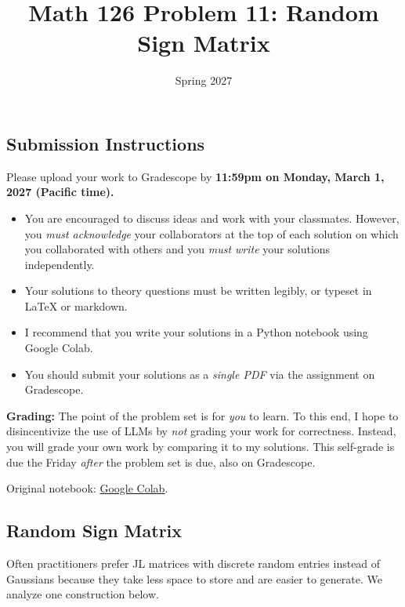 \documentclass{article}
\title{Math 126 Problem 11: Random Sign Matrix}
\author{} %
\date{Spring 2027}
\begin{document}
\maketitle

\hypertarget{submission-instructions}{%
\subsection*{Submission Instructions}\label{submission-instructions}}

Please upload your work to Gradescope by \textbf{11:59pm on Monday, March 1, 2027 (Pacific time).}

\begin{itemize}
\item
  You are encouraged to discuss ideas and work with your classmates. However, you \emph{must acknowledge} your collaborators at the top of each solution on which you collaborated with others and you \emph{must write} your solutions independently.
\item
  Your solutions to theory questions must be written legibly, or typeset in LaTeX or markdown.
\item
  I recommend that you write your solutions in a Python notebook using Google Colab.
\item
  You should submit your solutions as a \emph{single PDF} via the assignment on Gradescope.
\end{itemize}

\textbf{Grading:} The point of the problem set is for \emph{you} to learn. To this end, I hope to disincentivize the use of LLMs by \emph{not} grading your work for correctness. Instead, you will grade your own work by comparing it to my solutions. This self-grade is due the Friday \emph{after} the problem set is due, also on Gradescope.

\noindent Original notebook: \href{https://colab.research.google.com/drive/1aW6LjXEWIVPulxRxWJs0Q1rrR6k4pq4W?usp=sharing}{Google Colab}.

\hypertarget{random-sign-matrix}{%
\subsection*{Random Sign Matrix}\label{random-sign-matrix}}

Often practitioners prefer JL matrices with discrete random entries instead of Gaussians because they take less space to store and are easier to generate. We analyze one construction below.
\end{document}
